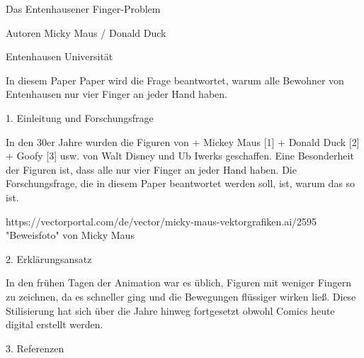 \documentclass{article}
\begin{document}
Das Entenhausener Finger-Problem

Autoren Micky Maus / Donald Duck

Entenhausen Universität

In diesem Paper Paper wird die Frage beantwortet, warum alle Bewohner von 
Entenhausen nur vier Finger an jeder Hand haben.

1. Einleitung und Forschungsfrage

In den 30er Jahre wurden die Figuren von 
+ Mickey Maus [1]
+ Donald Duck  [2]
+ Goofy [3] usw. 
von Walt Disney und Ub Iwerks geschaffen. Eine Besonderheit der Figuren ist, 
dass alle nur vier Finger an jeder Hand haben. Die Forschungsfrage, die in 
diesem Paper beantwortet werden soll, ist, warum das so ist.

https://vectorportal.com/de/vector/micky-maus-vektorgrafiken.ai/2595
"Beweisfoto" von Micky Maus

2. Erklärungsansatz

In den frühen Tagen der Animation war es üblich, Figuren mit weniger Fingern zu 
zeichnen, da es schneller ging und die Bewegungen flüssiger wirken ließ. Diese 
Stilisierung hat sich über die Jahre hinweg fortgesetzt obwohl Comics heute digital 
erstellt werden.

3. Referenzen

\end{document}
